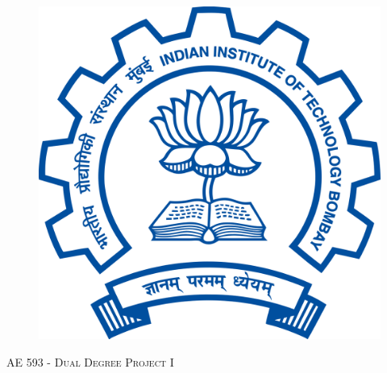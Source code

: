 \documentclass[
11pt, %
oneside, %
english, %
singlespacing, %
liststotoc, %
toctotoc, %
headsepline, %
]{MastersDoctoralThesis} %
\author{K T Prajwal Prathiksh} %
\begin{document}
\frontmatter %

\pagestyle{plain} %


\begin{titlepage}
\begin{center}


\begin{figure}[H]
\centering
\includegraphics[scale=0.12]{Figures/iitb-logo}
\end{figure}

\vspace*{.06\textheight}
{\scshape\LARGE \univname\par}\vspace{1.5cm} %
\textsc{\Large AE 593 - Dual Degree Project I }\\[0.5cm] %

\HRule \\[0.4cm] %
{\huge \bfseries \ttitle\par}\vspace{0.4cm} %
\HRule \\[1.5cm] %
 

\end{center}
\end{titlepage}
\end{document}
